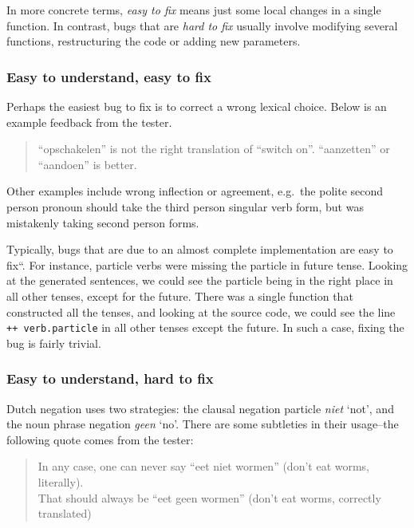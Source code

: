 In more concrete terms, \emph{easy to fix} means just some local changes
in a single function. In contrast, bugs that are \emph{hard to fix}
usually involve modifying several functions, restructuring the code or
adding new parameters.

\subsubsection{Easy to understand, easy to
fix}\label{easy-to-understand-easy-to-fix}

Perhaps the easiest bug to fix is to correct a wrong lexical choice.
Below is an example feedback from the tester.

\begin{quote}
``opschakelen'' is not the right translation of ``switch on''.
``aanzetten'' or ``aandoen'' is better.
\end{quote}

Other examples include wrong inflection or agreement, e.g.~the polite
second person pronoun should take the third person singular verb form,
but was mistakenly taking second person forms.

Typically, bugs that are due to an almost complete implementation are
easy to fix``. For instance, particle verbs were missing the particle in
future tense. Looking at the generated sentences, we could see the
particle being in the right place in all other tenses, except for the
future. There was a single function that constructed all the tenses, and
looking at the source code, we could see the line
\texttt{++ verb.particle} in all other tenses except the future. In such
a case, fixing the bug is fairly trivial.

\subsubsection{Easy to understand, hard to
fix}\label{easy-to-understand-hard-to-fix}
Dutch negation uses two strategies: the clausal negation particle
\emph{niet} `not', and the noun phrase negation \emph{geen} `no'. There
are some subtleties in their usage--the following quote comes from the
tester:

\begin{quote}
In any case, one can never say ``eet niet wormen'' (don't eat worms,
literally).\\That should always be ``eet geen wormen'' (don't eat worms,
correctly translated)
\end{quote}

